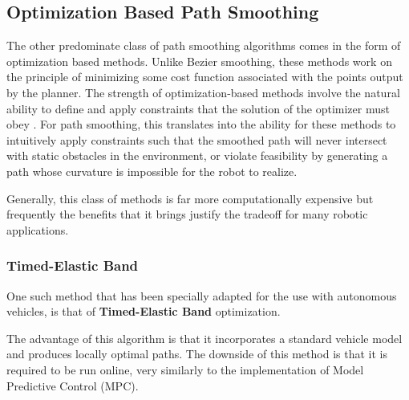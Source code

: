 \subsection{Optimization Based Path Smoothing}
The other predominate class of path smoothing algorithms comes in the form of optimization based methods. Unlike Bezier smoothing, these methods work on the principle of minimizing some cost function associated with the points output by the planner. The strength of optimization-based methods involve the natural ability to define and apply constraints that the solution of the optimizer must obey \cite{bezier2018}. For path smoothing, this translates into the ability for these methods to intuitively apply constraints such that the smoothed path will never intersect with static obstacles in the environment, or violate feasibility by generating a path whose curvature is impossible for the robot to realize.

Generally, this class of methods is far more computationally expensive but frequently the benefits that it brings justify the tradeoff for many robotic applications. 

\newline
\subsubsection{Timed-Elastic Band}
One such method that has been specially adapted for the use with autonomous vehicles, is that of \textbf{Timed-Elastic Band} optimization. \cite{time_elastic_band}    



The advantage of this algorithm is that it incorporates a standard vehicle model and produces locally optimal paths. The downside of this method is that it is required to be run online, very similarly to the implementation of Model Predictive Control (MPC).



